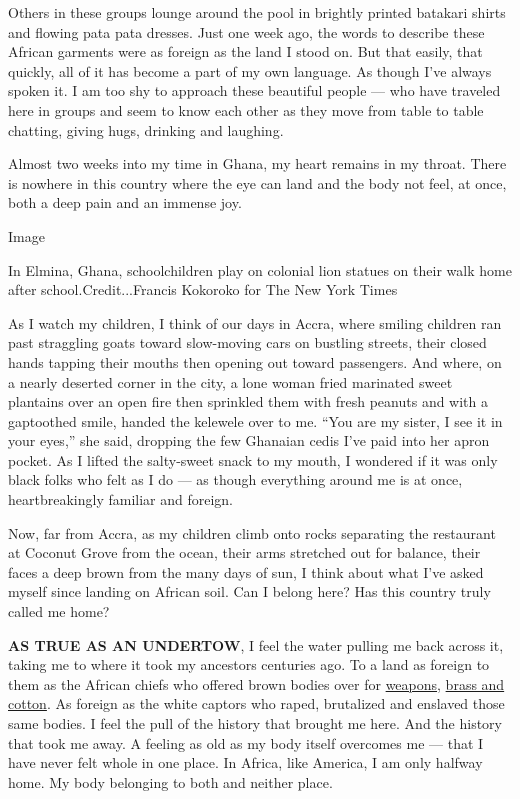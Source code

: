 Others in these groups lounge around the pool in brightly printed
batakari shirts and flowing pata pata dresses. Just one week ago, the
words to describe these African garments were as foreign as the land I
stood on. But that easily, that quickly, all of it has become a part of
my own language. As though I've always spoken it. I am too shy to
approach these beautiful people --- who have traveled here in groups and
seem to know each other as they move from table to table chatting,
giving hugs, drinking and laughing.

Almost two weeks into my time in Ghana, my heart remains in my throat.
There is nowhere in this country where the eye can land and the body not
feel, at once, both a deep pain and an immense joy.

Image

In Elmina, Ghana, schoolchildren play on colonial lion statues on their
walk home after school.Credit...Francis Kokoroko for The New York Times

As I watch my children, I think of our days in Accra, where smiling
children ran past straggling goats toward slow-moving cars on bustling
streets, their closed hands tapping their mouths then opening out toward
passengers. And where, on a nearly deserted corner in the city, a lone
woman fried marinated sweet plantains over an open fire then sprinkled
them with fresh peanuts and with a gaptoothed smile, handed the kelewele
over to me. ``You are my sister, I see it in your eyes,'' she said,
dropping the few Ghanaian cedis I've paid into her apron pocket. As I
lifted the salty-sweet snack to my mouth, I wondered if it was only
black folks who felt as I do --- as though everything around me is at
once, heartbreakingly familiar and foreign.

Now, far from Accra, as my children climb onto rocks separating the
restaurant at Coconut Grove from the ocean, their arms stretched out for
balance, their faces a deep brown from the many days of sun, I think
about what I've asked myself since landing on African soil. Can I belong
here? Has this country truly called me home?

\textbf{AS TRUE AS AN UNDERTOW}, I feel the water pulling me back across
it, taking me to where it took my ancestors centuries ago. To a land as
foreign to them as the African chiefs who offered brown bodies over for
\href{https://www.theguardian.com/commentisfree/2007/mar/31/epiloguetothedebateonslav}{weapons},
\href{http://www.discoveringbristol.org.uk/slavery/routes/bristol-to-africa/trade-goods/slave-trade-goods/}{brass
and cotton}. As foreign as the white captors who raped, brutalized and
enslaved those same bodies. I feel the pull of the history that brought
me here. And the history that took me away. A feeling as old as my body
itself overcomes me --- that I have never felt whole in one place. In
Africa, like America, I am only halfway home. My body belonging to both
and neither place.

